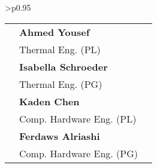 \begin{center}
\begin{minipage}{\textwidth}
\begin{tabular}{>{\centering\arraybackslash}p{}}
\begin{tabular}{>{\centering\arraybackslash}p{} >{\centering\arraybackslash}p{} >{\centering\arraybackslash}p{}}
& \textbf{Ahmed Yousef} & \textbf{}\\
& \small Thermal Eng. (PL) & \small  \\

& \textbf{Isabella Schroeder} & \\
& \small Thermal Eng. (PG) & \\

& \textbf{Kaden Chen} & \\
& \small Comp. Hardware Eng. (PL) & \\

& \textbf{Ferdaws Alriashi} & \\
& \small Comp. Hardware Eng. (PG) & \\

\end{tabular}
\end{tabular}
\end{minipage}
\end{center}
